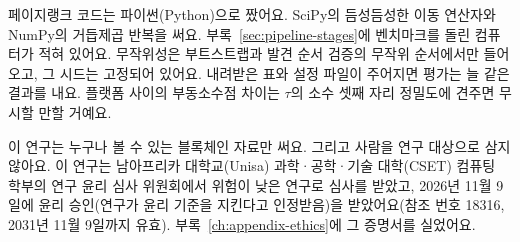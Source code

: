 페이지랭크 코드는 파이썬(Python)으로 짰어요. SciPy의 듬성듬성한 이동 연산자와 NumPy의 거듭제곱 반복을 써요. 부록~\ref{sec:pipeline-stages}에 벤치마크를 돌린 컴퓨터가 적혀 있어요. 무작위성은 부트스트랩과 발견 순서 검증의 무작위 순서에서만 들어오고, 그 시드는 고정되어 있어요. 내려받은 표와 설정 파일이 주어지면 평가는 늘 같은 결과를 내요. 플랫폼 사이의 부동소수점 차이는 $\tau$의 소수 셋째 자리 정밀도에 견주면 무시할 만할 거예요.


이 연구는 누구나 볼 수 있는 블록체인 자료만 써요. 그리고 사람을 연구 대상으로 삼지 않아요. 이 연구는 남아프리카 대학교(Unisa) 과학·공학·기술 대학(CSET) 컴퓨팅 학부의 연구 윤리 심사 위원회에서 위험이 낮은 연구로 심사를 받았고, 2026년 11월 9일에 윤리 승인(연구가 윤리 기준을 지킨다고 인정받음)을 받았어요(참조 번호 18316, 2031년 11월 9일까지 유효). 부록~\ref{ch:appendix-ethics}에 그 증명서를 실었어요.

